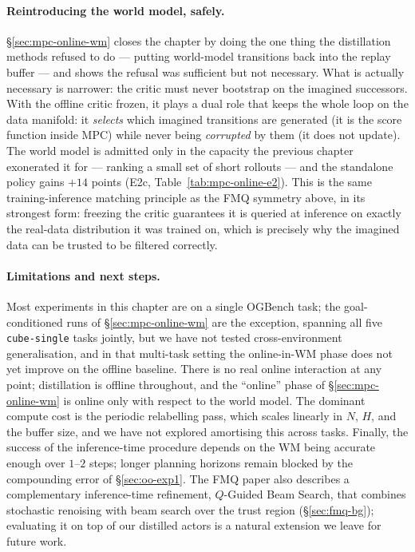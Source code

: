 \paragraph{Reintroducing the world model, safely.} \S\ref{sec:mpc-online-wm} closes the chapter by doing the one thing the distillation methods refused to do --- putting world-model transitions back into the replay buffer --- and shows the refusal was sufficient but not necessary. What is actually necessary is narrower: the critic must never bootstrap on the imagined successors. With the offline critic frozen, it plays a dual role that keeps the whole loop on the data manifold: it \emph{selects} which imagined transitions are generated (it is the score function inside MPC) while never being \emph{corrupted} by them (it does not update). The world model is admitted only in the capacity the previous chapter exonerated it for --- ranking a small set of short rollouts --- and the standalone policy gains $+14$ points (E2c, Table~\ref{tab:mpc-online-e2}). This is the same training-inference matching principle as the FMQ symmetry above, in its strongest form: freezing the critic guarantees it is queried at inference on exactly the real-data distribution it was trained on, which is precisely why the imagined data can be trusted to be filtered correctly.

\paragraph{Limitations and next steps.} Most experiments in this chapter are on a single OGBench task; the goal-conditioned runs of \S\ref{sec:mpc-online-wm} are the exception, spanning all five \texttt{cube-single} tasks jointly, but we have not tested cross-environment generalisation, and in that multi-task setting the online-in-WM phase does not yet improve on the offline baseline. There is no real online interaction at any point; distillation is offline throughout, and the ``online'' phase of \S\ref{sec:mpc-online-wm} is online only with respect to the world model. The dominant compute cost is the periodic relabelling pass, which scales linearly in $N$, $H$, and the buffer size, and we have not explored amortising this across tasks. Finally, the success of the inference-time procedure depends on the WM being accurate enough over $1$--$2$ steps; longer planning horizons remain blocked by the compounding error of \S\ref{sec:oo-exp1}. The FMQ paper also describes a complementary inference-time refinement, $Q$-Guided Beam Search, that combines stochastic renoising with beam search over the trust region (\S\ref{sec:fmq-bg}); evaluating it on top of our distilled actors is a natural extension we leave for future work.
